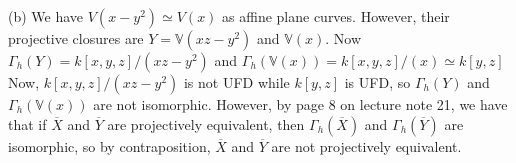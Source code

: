 \documentclass[a4paper]{article}
\begin{document}
\newpage
     
     (b) We have $V(x - y^2) \simeq V(x)$ as affine plane
     curves. However,
     their projective closures are
     $Y =\mathbb{V}(xz-y^2)$ and $\mathbb{V}(x)$. Now
     $\Gamma_h (Y) = k\left[ x,y,z \right] /(xz-y^2)$ and
     $\Gamma_h (\mathbb{V}(x)) = k\left[ x,y,z \right] /(x)
     \simeq k\left[ y,z \right] 
     $
     Now, $k\left[ x,y,z \right] / (xz-y^2)$ is not UFD while
     $k\left[ y,z \right] $ is UFD, so
     $\Gamma_h (Y)$ and $\Gamma_h (\mathbb{V}(x))$ are not isomorphic. However,
     by
     page 8 on lecture note 21, we have that
     if  $\overline{X}$ and $\overline{Y}$ are projectively equivalent, then
     $\Gamma_h (\overline{X})$ and $\Gamma_h (\overline{Y})$ are isomorphic, so
     by contraposition, $\overline{X}$ and $\overline{Y}$ are not projectively
     equivalent.
     
     
\end{document}
